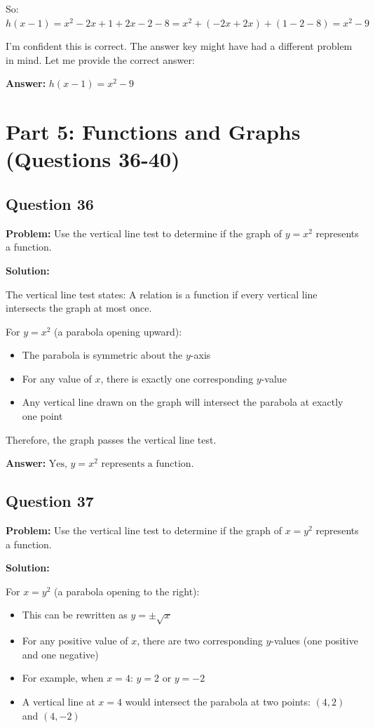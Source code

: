 \documentclass[12pt]{article}
\begin{document}
So: $h(x-1) = x^2 - 2x + 1 + 2x - 2 - 8 = x^2 + (-2x + 2x) + (1 - 2 - 8) = x^2 - 9$

I'm confident this is correct. The answer key might have had a different problem in mind. Let me provide the correct answer:

\textbf{Answer:} $\boxed{h(x-1) = x^2 - 9}$

\newpage

\section*{Part 5: Functions and Graphs (Questions 36-40)}

\subsection*{Question 36}
\textbf{Problem:} Use the vertical line test to determine if the graph of $y = x^2$ represents a function.

\textbf{Solution:}

The vertical line test states: A relation is a function if every vertical line intersects the graph at most once.

For $y = x^2$ (a parabola opening upward):
\begin{itemize}
\item The parabola is symmetric about the $y$-axis
\item For any value of $x$, there is exactly one corresponding $y$-value
\item Any vertical line drawn on the graph will intersect the parabola at exactly one point
\end{itemize}

Therefore, the graph passes the vertical line test.

\textbf{Answer:} $\boxed{\text{Yes, } y = x^2 \text{ represents a function.}}$

\subsection*{Question 37}
\textbf{Problem:} Use the vertical line test to determine if the graph of $x = y^2$ represents a function.

\textbf{Solution:}

For $x = y^2$ (a parabola opening to the right):
\begin{itemize}
\item This can be rewritten as $y = \pm\sqrt{x}$
\item For any positive value of $x$, there are two corresponding $y$-values (one positive and one negative)
\item For example, when $x = 4$: $y = 2$ or $y = -2$
\item A vertical line at $x = 4$ would intersect the parabola at two points: $(4, 2)$ and $(4, -2)$
\end{itemize}
\end{document}
